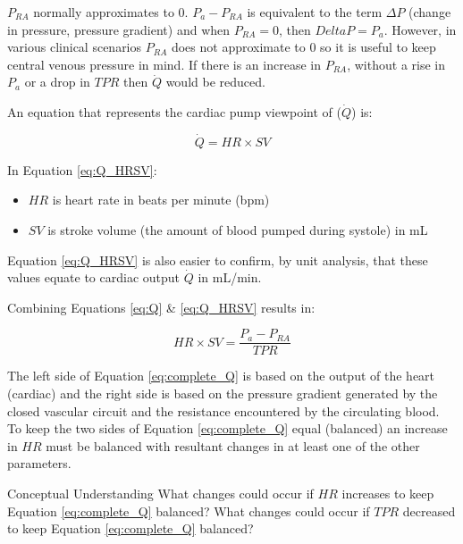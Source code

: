 $P_{RA}$ normally approximates to 0. $P_{a} - P_{RA}$ is equivalent to the term $\Delta P$ (change in pressure, pressure gradient) and when $P_{RA} = 0$, then $Delta P = P_{a}$.
However, in various clinical scenarios $P_{RA}$ does not approximate to 0 so it is useful to keep central venous pressure in mind. If there is an increase in $P_{RA}$, without a rise in $P_{a}$ or a drop in $TPR$ then $\dot{Q}$ would be reduced. 

\vspace{.5cm}
An equation that represents the cardiac pump viewpoint of ($\dot{Q}$) is:

\begin{equation}
    \dot{Q} = HR \times SV
    \label{eq:Q_HRSV}
\end{equation}

In Equation \ref{eq:Q_HRSV}:
\begin{itemize}
    \item $HR$ is heart rate in beats per minute (bpm)
    \item $SV$ is stroke volume (the amount of blood pumped during systole) in mL
\end{itemize}

Equation \ref{eq:Q_HRSV} is also easier to confirm, by unit analysis, that these values equate to cardiac output $\dot{Q}$ in mL/min.

\vspace{.5cm}
Combining Equations \ref{eq:Q} \& \ref{eq:Q_HRSV} results in:

\begin{equation}
    HR \times SV = \frac{P_{a} - P_{RA}}{TPR}
    \label{eq:complete_Q}
\end{equation}

The left side of Equation \ref{eq:complete_Q} is based on the output of the heart (cardiac) and the right side is based on the pressure gradient generated by the closed vascular circuit and the resistance encountered by the circulating blood.
To keep the two sides of Equation \ref{eq:complete_Q} equal (balanced) an increase in $HR$ must be balanced with resultant changes in at least one of the other parameters. 

\begin{question}{Conceptual Understanding}
What changes could occur if $HR$ increases to keep Equation \ref{eq:complete_Q} balanced?
What changes could occur if $TPR$ decreased to keep Equation \ref{eq:complete_Q} balanced?
\end{question}

